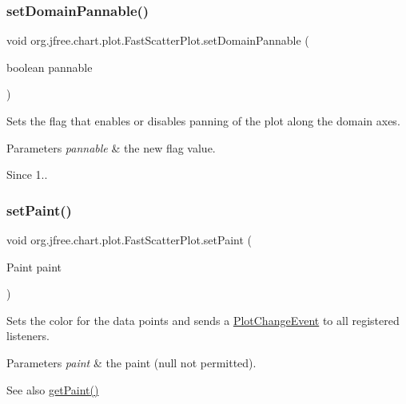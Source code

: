 \subsubsection{\texorpdfstring{set\+Domain\+Pannable()}{setDomainPannable()}}
{\footnotesize\ttfamily void org.\+jfree.\+chart.\+plot.\+Fast\+Scatter\+Plot.\+set\+Domain\+Pannable (\begin{DoxyParamCaption}\item[{boolean}]{pannable }\end{DoxyParamCaption})}

Sets the flag that enables or disables panning of the plot along the domain axes.


\begin{DoxyParams}{Parameters}
{\em pannable} & the new flag value.\\
\hline
\end{DoxyParams}
\begin{DoxySince}{Since}
1.. 
\end{DoxySince}
\mbox{\label{classorg_1_1jfree_1_1chart_1_1plot_1_1_fast_scatter_plot_ac6e77b9dddd49efb9053352792c606fe}} 
\subsubsection{\texorpdfstring{set\+Paint()}{setPaint()}}
{\footnotesize\ttfamily void org.\+jfree.\+chart.\+plot.\+Fast\+Scatter\+Plot.\+set\+Paint (\begin{DoxyParamCaption}\item[{Paint}]{paint }\end{DoxyParamCaption})}

Sets the color for the data points and sends a \mbox{\hyperlink{}{Plot\+Change\+Event}} to all registered listeners.


\begin{DoxyParams}{Parameters}
{\em paint} & the paint ({\ttfamily null} not permitted).\\
\hline
\end{DoxyParams}
\begin{DoxySeeAlso}{See also}
\mbox{\hyperlink{classorg_1_1jfree_1_1chart_1_1plot_1_1_fast_scatter_plot_ab465594de61ac0750f08993b2a8d30d9}{get\+Paint()}} 
\end{DoxySeeAlso}
\mbox{\label{classorg_1_1jfree_1_1chart_1_1plot_1_1_fast_scatter_plot_a29f894e023c3c7b2b34baedf7db61127}} 
